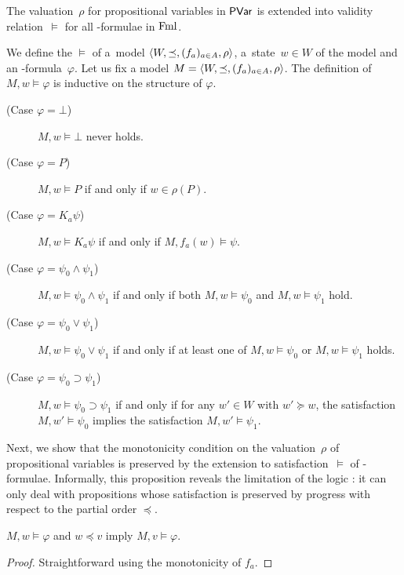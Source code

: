        The valuation~$\rho$ for propositional variables in $\mathsf{PVar}$ is extended into validity
       relation~$\models$ for all \iec-formulae in $\mathsf{\operatorname{Fml}}$.
       \begin{definition}
	We define the  $\models$ of a~model
	$\langle{W,\preceq,(f_a)_{a\in A},\rho}\rangle$, a~state~$w\in W$ of the model and an
	\iec-formula~$\varphi$.
	Let us fix a model $M=\langle{W,\preceq,(f_a)_{a\in A},\rho}\rangle$.
	\newcommand{\m}{M}
	The definition of $M,w\models\varphi$ is inductive on the structure of $\varphi$.
	\begin{description}
	 \item[(Case $\varphi=\bot$)] $\m, w\models \bot$ never holds.
	 \item[(Case $\varphi= P$)] $\m, w\models P$ if and only if
	      $w \in
	      \rho(P)$.
	 \item[(Case $\varphi = K_a \psi$)]
	      $\m, w\models K_a \psi$ if and only if
	      $\m, f_a(w)\models \psi$.
	 \item[(Case $\varphi = \psi_0\land\psi_1$)]
	      $\m, w\models \psi_0\land\psi_1$ if and only if both
	      $\m, w\models \psi_0$ and $\m,w\models \psi_1$ hold.
	 \item[(Case $\varphi = \psi_0\vee\psi_1$)]
	      $\m, w\models \psi_0\vee\psi_1$ if and only if at least
	      one of
	      $\m, w\models \psi_0$ or $\m,w\models \psi_1$ holds.
	 \item[(Case $\varphi = \psi_0\supset \psi_1$)]
	      $\m, w\models \psi_0\supset\psi_1$ if and only if
	      for any $w'\in W$ with $w'\succeq w$, the satisfaction $M,w'\models \psi_0$ implies
	      the satisfaction $M, w'\models
	      \psi_1$.
	\end{description}
       \end{definition}

       Next, we show that the monotonicity condition on the valuation~$\rho$ of
       propositional variables is preserved by the extension
       to satisfaction~$\models$ of \iec-formulae. Informally, this
       proposition
       reveals the limitation of the logic \iec:
       it can only deal with propositions whose satisfaction is preserved by progress with respect to
       the partial order $\preceq$.
       \begin{proposition}
	\label{kripke}
	$M,w\models \varphi$ and $w\preceq v$ imply
	$M,v\models \varphi$.
       \end{proposition}
       \begin{proof}
	Straightforward using the monotonicity of $f_a$.
       \end{proof}

